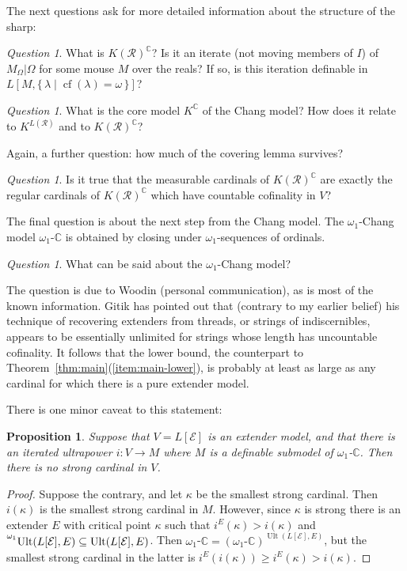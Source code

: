 \documentclass[
twoside,
]{article}
\newtheorem{proposition}[theorem]{Proposition}
\theoremstyle{definition}
\theoremstyle{remark}
\newtheorem{question}[theorem]{Question}
\newcommand\reals{\mathcal{R}}
\newcommand{\cut}{{\vert}}
\newcommand{\set}[1]{\{\,#1\,\}}
\DeclareMathOperator{\ult}{Ult}
\DeclareMathOperator{\cof}{cf}
\newcommand\chang{\mathbb{C}}
\begin{document}
The next questions ask for more detailed information about the
structure of the sharp:
\begin{question}
  What is $K(\mathcal{R})^{\chang}$?   Is it an iterate (not moving
  members of $I$) of
  $M_{\Omega}\cut\Omega$ for some mouse $M$ over the reals?  If so, is
  this iteration definable in
  $L[M,\set{\lambda\mid\cof(\lambda)=\omega}]$? 
\end{question}

\begin{question}
  What is the core model $K^{\chang}$ of the Chang model?
  How does it relate to   $K^{L(\mathcal{R})}$ and to $K(\mathcal{R})^{\chang}$?
\end{question}
\begin{todoenv}
  Again, a further question: how much of the covering lemma survives?
\end{todoenv}
\begin{question}
  Is it true that the  measurable cardinals of 
  $K(\reals)^{\chang}$ are exactly the regular cardinals of
  $K(\reals)^{\chang}$ which have countable cofinality in $V$?
\end{question}
\medskip{}

The final question is about the next step from the Chang model.   The
$\omega_1$-Chang model $\omega_1$-$\chang$ is obtained by closing
under $\omega_1$-sequences of ordinals.

\begin{question}
  What can be said about the $\omega_1$-Chang model?
\end{question} 
The question is due to Woodin  (personal communication), as is most 
of the known information.  Gitik has pointed out that (contrary to
my earlier belief) his technique of recovering extenders from threads, or
strings of indiscernibles, appears to be essentially unlimited for
strings whose length has uncountable cofinality.  It follows that
the lower bound, the counterpart to
Theorem~\ref{thm:main}(\ref{item:main-lower}), is probably at least as
large as any cardinal for which there is a pure extender model.

There is one minor caveat to this statement:
\begin{proposition}\label{thm:omega1-sharp-lower-bound}
  Suppose that $V=L[\mathcal{E}]$ is an extender model, and that
  there is an iterated ultrapower $i\colon V\to M$ where $M$ is a
  definable submodel of $\omega_1$-$\chang$.  Then there is no
  strong cardinal in $V$.
\end{proposition}
\begin{proof}
  Suppose the contrary, and let $\kappa$ be the smallest strong
  cardinal.  Then $i(\kappa)$ is the smallest strong cardinal in
  $M$.  However, since $\kappa$ is strong there is an extender $E$
  with critical point $\kappa$ such that $i^{E}(\kappa)>i(\kappa)$
  and
  ${\vphantom{\bigl)}}^{\omega_1}{\ult(L[\mathcal{E}],E)}\subseteq\ult(L[\mathcal{E}],E)$.
  Then
  $\omega_1$-$\chang=(\text{$\omega_1$-$\chang$})^{\ult(L[\mathcal{E}],E)}$,
  but the smallest strong cardinal in the latter is
  $i^{E}(i(\kappa))\ge i^E(\kappa)>i(\kappa)$.
\end{proof}
\end{document}
